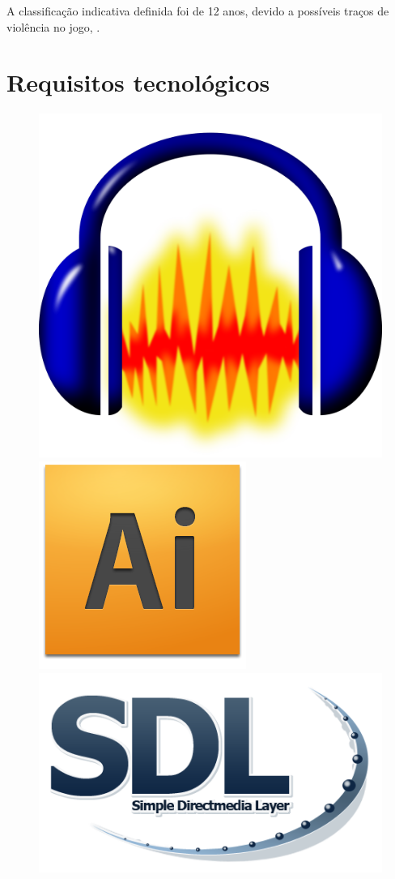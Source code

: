 \documentclass[11pt]{article} %
\begin{document}
A classificação indicativa definida foi de 12 anos, devido a possíveis traços de violência no jogo, . 


\newpage

\section{Requisitos tecnológicos}

\begin{figure}[!htp]
\begin{center}
  \includegraphics[scale=0.04]{res/audacity.png} \quad
  \includegraphics[scale=0.3]{res/adobe_illustrator.png} \quad
  \includegraphics[scale=0.25]{res/Sdl-logo.png} \quad

\end{center}
\end{figure}
\end{document}
